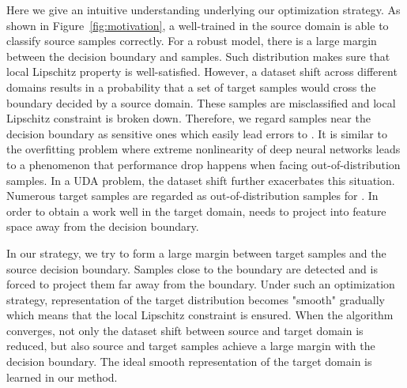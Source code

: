 \documentclass[10pt,twocolumn,letterpaper]{article}
\begin{document}
Here we give an intuitive understanding underlying our optimization strategy. As shown in Figure~\ref{fig:motivation}, a  well-trained in the source domain is able to classify source samples correctly. For a robust model, there is a large margin between the decision boundary and samples. Such distribution makes sure that local Lipschitz property is well-satisfied. However, a dataset shift across different domains results in a probability that a set of target samples would cross the boundary decided by a source domain. These samples are misclassified and local Lipschitz constraint is broken down. Therefore, we regard samples near the decision boundary as sensitive ones which easily lead errors to . It is similar to the overfitting problem where extreme nonlinearity of deep neural networks leads to a phenomenon that performance drop happens when facing out-of-distribution samples. In a UDA problem, the dataset shift further exacerbates this situation. Numerous target samples are regarded as out-of-distribution samples for . In order to obtain a  work well in the target domain,  needs to project  into feature space away from the decision boundary.

In our strategy, we try to form a large margin between target samples and the source decision boundary. Samples close to the boundary are detected and  is forced to project them far away from the boundary. Under such an optimization strategy, representation of the target distribution becomes "smooth" gradually which means that the local Lipschitz constraint is ensured. When the algorithm converges, not only the dataset shift between source and target domain is reduced, but also source and target samples achieve a large margin with the decision boundary. The ideal smooth representation of the target domain is learned in our method.
\end{document}

